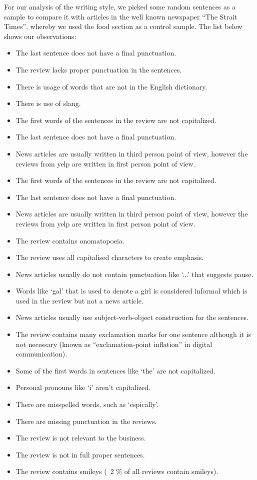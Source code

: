 For our analysis of the writing style, we picked some random sentences as a sample to compare it with articles in the well known newspaper “The Strait Times”, whereby we used the food section as a control sample. The list below shows our observations:

\begin{itemize}
    \item The last sentence does not have a final punctuation.
    \item The review lacks proper punctuation in the sentences.
    \item There is usage of words that are not in the English dictionary.
    \item There is use of slang. 
    \item The first words of the sentences in the review are not capitalized.
    \item The last sentence does not have a final punctuation.
    \item News articles are usually written in third person point of view, however the reviews from yelp are written in first person point of view.
    \item The first words of the sentences in the review are not capitalized.
    \item The last sentence does not have a final punctuation.
    \item News articles are usually written in third person point of view, however the reviews from yelp are written in first person point of view.
    \item The review contains onomatopoeia.
    \item The review uses all capitalised characters to create emphasis.
    \item News articles usually do not contain punctuation like ‘...’ that suggests pause.
    \item Words like ‘gal’ that is used to denote a girl is considered informal which is used in the review but not a news article.
    \item News articles usually use subject-verb-object construction for the sentences.
    \item The review contains many exclamation marks for one sentence although it is not necessary (known as “exclamation-point inflation” in digital communication).
    \item Some of the first words in sentences like ‘the’ are not capitalized.
    \item Personal pronouns like ‘i’ aren't capitalized.
    \item There are misspelled words, such as ‘espically’.
    \item There are missing punctuation in the reviews.
    \item The review is not relevant to the business.
    \item The review is not in full proper sentences.
    \item The review contains smileys (~2 \% of all reviews contain smileys).
\end{itemize}
